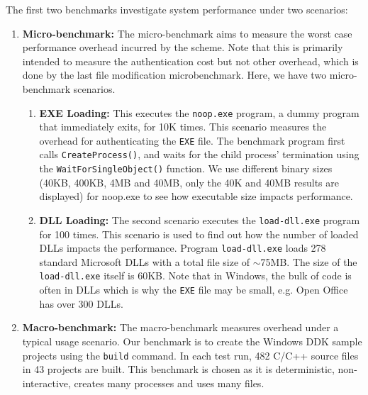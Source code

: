 
The first two benchmarks investigate system performance under
two scenarios:
\begin{enumerate}
\item {\bf Micro-benchmark:}
The micro-benchmark aims to measure the worst case performance overhead
incurred by the scheme. 
Note that this is primarily intended to measure the authentication cost
but not other overhead, which is done by the last file modification 
microbenchmark.
Here, we have two micro-benchmark scenarios.
\begin{enumerate}
\item {\bf EXE Loading:}
This executes the {\tt noop.exe} program, a dummy program
that immediately exits, for 10K times.
This scenario measures the overhead for authenticating the
{\tt EXE} file.
The benchmark program first calls {\tt CreateProcess()},
and waits for the child process' termination using the {\tt WaitForSingleObject()} function.
We use different binary sizes (40KB, 400KB, 4MB and 40MB, only the 40K and 40MB
results are displayed)
for noop.exe to see how executable size impacts performance.
\item {\bf DLL Loading:}
The second scenario executes the {\tt load-dll.exe} program for 100 times.
This scenario is used to find out how the number of loaded DLLs impacts the performance.
Program {\tt load-dll.exe} loads 278 standard Microsoft
DLLs with a total file size of $\sim$75MB.
The size of the {\tt load-dll.exe} itself is 60KB.
Note that in Windows, the bulk of code is often in DLLs which is why the 
{\tt EXE} file may be small, e.g. Open Office has over 300 DLLs.
\end{enumerate}

\item {\bf Macro-benchmark:}
The macro-benchmark measures overhead under a typical usage scenario.
Our benchmark is to create the Windows DDK sample projects
using the {\tt build} command.
In each test run, 482 C/C++ source files in 43 projects are built.
This benchmark is chosen as it is deterministic, non-interactive, creates
many processes and uses many files.
\end{enumerate}


